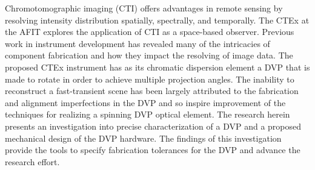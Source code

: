 Chromotomographic imaging (CTI) offers advantages in remote sensing by resolving intensity distribution spatially, spectrally, and temporally. The \acf{CTEx} at the \acf{AFIT} explores the application of CTI as a space-based observer. Previous work in instrument development has revealed many of the intricacies of component fabrication and how they impact the resolving of image data. The proposed \ac{CTEx} instrument has as its chromatic dispersion element a \ac{DVP} that is made to rotate in order to achieve multiple projection angles. The inability to reconstruct a fast-transient scene has been largely attributed to the fabrication and alignment imperfections in the \ac{DVP} and so inspire improvement of the techniques for realizing a spinning \ac{DVP} optical element. The research herein presents an investigation into precise characterization of a \ac{DVP} and a proposed mechanical design of the \ac{DVP} hardware. The findings of this investigation provide the tools to specify fabrication tolerances for the \ac{DVP} and advance the research effort.

